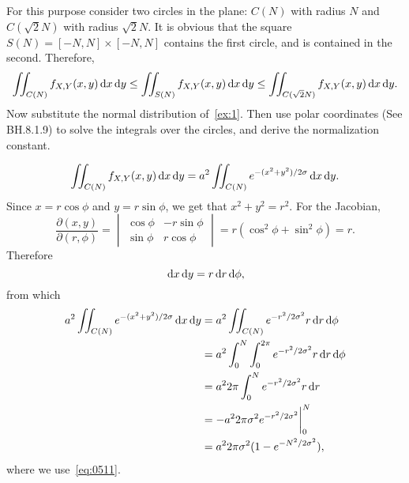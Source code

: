 \documentclass[lectures-questions]{subfiles}
\begin{document}
\begin{exercise}
For this purpose consider two circles in the plane: $C(N)$ with radius $N$ and $C(\sqrt 2 N)$ with radius $\sqrt 2 N$.
It is obvious that the square $S(N) = [-N,N]\times[-N,N]$ contains the first circle, and is contained in the second.
Therefore,
\begin{equation}
  \label{eq:0513}
  \iint_{C(N)}f_{X,Y}(x,y) \,\textrm{d}x\,\textrm{d}y \leq
  \iint_{S(N)}f_{X,Y}(x,y) \,\textrm{d}x\,\textrm{d}y \leq
  \iint_{C(\sqrt 2 N)}f_{X,Y}(x,y) \,\textrm{d}x\,\textrm{d}y.
\end{equation}
Now substitute the normal distribution of~\cref{ex:1}.
Then use polar coordinates (See BH.8.1.9) to solve the integrals over the circles, and derive the normalization constant.
\begin{solution}
\begin{equation}
\label{eq:0514}
  \iint_{C(N)}f_{X,Y}(x,y) \,\textrm{d}x\,\textrm{d}y =
a^{2}  \iint_{C(N)} e^{-(x^{2}+y^{2})/2\sigma} \,\textrm{d}x\,\textrm{d}y.
\end{equation}
Since  $x = r \cos \phi$ and $y=r\sin \phi$, we get that $x^2+y^2 = r^{2}$. For the Jacobian,
\begin{equation}
  \label{eq:0515}
  \frac{\partial(x, y)}{\partial(r,\phi)} =
  \begin{vmatrix}
    \cos \phi  & -r\sin \phi \\
    \sin \phi  & r\cos \phi
  \end{vmatrix}
= r(\cos^{2} \phi + \sin^2 \phi) = r.
\end{equation}
Therefore
\begin{equation}
\label{eq:0516}
\,\textrm{d}x \,\textrm{d}y = r \,\textrm{d}r \,\textrm{d}\phi,
\end{equation}
from which
\begin{align}
a^{2}  \iint_{C(N)} e^{-(x^{2}+y^{2})/2\sigma} \,\textrm{d}x\,\textrm{d}y
&=a^{2}  \iint_{C(N)} e^{-r^{2}/2\sigma^{2}} r \,\textrm{d}r\,\textrm{d}\phi \\
&= a^{2}  \int_{0}^{N} \int_{0}^{2\pi} e^{-r^{2}/2\sigma^{2}} r \,\textrm{d}r\,\textrm{d}\phi \\
&= a^{2}  2\pi \int_{0}^{N}  e^{-r^{2}/2\sigma^{2}} r \,\textrm{d}r \\
&= - a^{2}  2\pi{\sigma^{2}} e^{-r^{2}/2\sigma^{2}}\biggr|_{0}^{N} \\
&= a^{2}2\pi{\sigma^{2}} (1-e^{-N^{2}/2\sigma^{2}}),
\end{align}
where we use~\cref{eq:0511}.



\end{solution}
\end{exercise}
\end{document}
